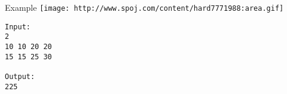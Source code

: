 Example
\texttt{[image: http://www.spoj.com/content/hard7771988:area.gif]}
\begin{verbatim}
Input:
2
10 10 20 20
15 15 25 30

Output:
225 

\end{verbatim}